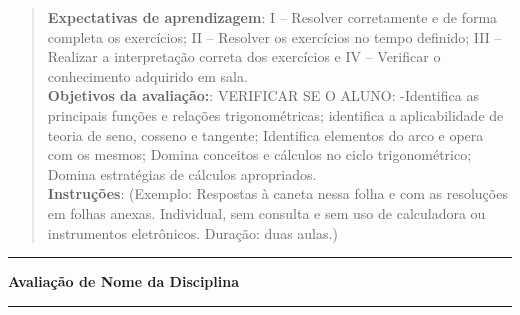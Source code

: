\documentclass[a4paper,11pt]{article}
\newcommand{\disciplina}{Nome da Disciplina}
\begin{document}

\begin{quote}
\begin{scriptsize}
\textbf{Expectativas de aprendizagem}: %
 I – Resolver corretamente e de forma completa os exercícios; II – Resolver os exercícios no tempo definido; III – Realizar a interpretação correta dos exercícios e IV – Verificar o conhecimento adquirido em sala.\\
\textbf{Objetivos da avaliação:}:   VERIFICAR SE O ALUNO: -Identifica as principais funções e relações trigonométricas;  identifica a aplicabilidade de teoria de seno, cosseno e tangente;  Identifica elementos do arco e opera com os mesmos;  Domina conceitos e cálculos no ciclo trigonométrico; Domina estratégias de cálculos apropriados.\\
\textbf{Instruções}:  (Exemplo: Respostas à caneta nessa folha e com as resoluções em folhas anexas. Individual, sem consulta e sem uso de calculadora ou instrumentos eletrônicos. Duração: duas aulas.)
\end{scriptsize}
\end{quote}

\hrule
\begin{center}
\begin{large}
\bf Avaliação de \disciplina \\
\end{large}
\end{center}
\hrule


\end{document}
